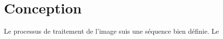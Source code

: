 \documentclass[a4paper , 12pt]{article}
\begin{document}
\section{Conception}
Le processus de traitement de l'image suis une séquence bien définie. Le
\section{}
\end{document}
